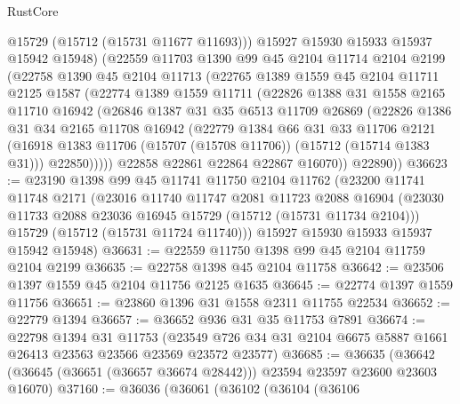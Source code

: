 \begin{lexlean}{RustCore}
\begin{coremodule}
          @15729
          (@15712 (@15731 @11677 @11693)))
        @15927
        @15930
        @15933
        @15937
        @15942
        @15948)
      (@22559
        @11703
        @1390
        @99
        @45
        @2104
        @11714
        @2104
        @2199
        (@22758
          @1390
          @45
          @2104
          @11713
          (@22765
            @1389
            @1559
            @45
            @2104
            @11711
            @2125
            @1587
            (@22774
              @1389
              @1559
              @11711
              (@22826
                @1388
                @31
                @1558
                @2165
                @11710
                @16942
                (@26846
                  @1387
                  @31
                  @35
                  @6513
                  @11709
                  @26869
                  (@22826
                    @1386
                    @31
                    @34
                    @2165
                    @11708
                    @16942
                    (@22779
                      @1384
                      @66
                      @31
                      @33
                      @11706
                      @2121
                      (@16918 @1383 @11706 (@15707 (@15708 @11706)) (@15712 (@15714 @1383 @31)))
                      @22850)))))
            @22858
            @22861
            @22864
            @22867
            @16070))
        @22890))
@36623 := @23190
    @1398
    @99
    @45
    @11741
    @11750
    @2104
    @11762
    (@23200
      @11741
      @11748
      @2171
      (@23016
        @11740
        @11747
        @2081
        @11723
        @2088
        @16904
        (@23030 @11733 @2088 @23036 @16945 @15729 (@15712 (@15731 @11734 @2104)))
        @15729
        (@15712 (@15731 @11724 @11740)))
      @15927
      @15930
      @15933
      @15937
      @15942
      @15948)
@36631 := @22559 @11750 @1398 @99 @45 @2104 @11759 @2104 @2199
@36635 := @22758 @1398 @45 @2104 @11758
@36642 := @23506 @1397 @1559 @45 @2104 @11756 @2125 @1635
@36645 := @22774 @1397 @1559 @11756
@36651 := @23860 @1396 @31 @1558 @2311 @11755 @22534
@36652 := @22779 @1394
@36657 := @36652 @936 @31 @35 @11753 @7891
@36674 := @22798
    @1394
    @31
    @11753
    (@23549 @726 @34 @31 @2104 @6675 @5887 @1661 @26413 @23563 @23566 @23569 @23572 @23577)
@36685 := @36635
    (@36642 (@36645 (@36651 (@36657 @36674 @28442))) @23594 @23597 @23600 @23603 @16070)
@37160 := @36036
    (@36061
      (@36102
        (@36104
          (@36106

\end{coremodule}
\end{lexlean}
